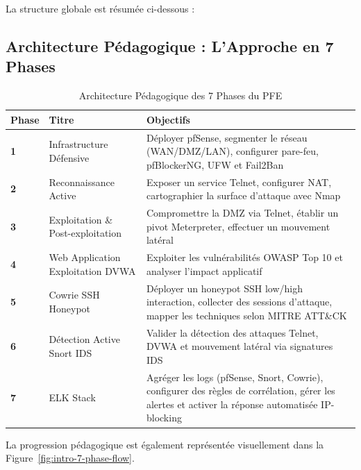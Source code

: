 \documentclass[12pt,a4paper,openany]{report}
\newcommand{\tableheadcolor}{\rowcolor{tableheadbg}}
\begin{document}
	La structure globale est résumée ci-dessous :
	
	\subsection{Architecture Pédagogique : L'Approche en 7 Phases}
	
	\begin{table}[H]
		\centering
		\renewcommand{\arraystretch}{1.5}
		\setlength{\arrayrulewidth}{0.5pt}
		\begin{tabular}{>{\centering\arraybackslash}p{1.5cm} p{4cm} p{7cm}}
			\arrayrulecolor{tableborder}
			\hline
			\tableheadcolor
			\textcolor{tableheadfg}{\textbf{Phase}} &
			\textcolor{tableheadfg}{\textbf{Titre}} &
			\textcolor{tableheadfg}{\textbf{Objectifs}} \\
			\hline
			\rowcolor{tablerowalt}
			\textbf{1} & Infrastructure Défensive & Déployer pfSense, segmenter le réseau (WAN/DMZ/LAN), configurer pare-feu, pfBlockerNG, UFW et Fail2Ban \\
			\textbf{2} & Reconnaissance Active & Exposer un service Telnet, configurer NAT, cartographier la surface d'attaque avec Nmap \\
			\rowcolor{tablerowalt}
			\textbf{3} & Exploitation \& Post-exploitation & Compromettre la DMZ via Telnet, établir un pivot Meterpreter, effectuer un mouvement latéral \\
			\textbf{4} & Web Application Exploitation DVWA & Exploiter les vulnérabilités OWASP Top 10 et analyser l'impact applicatif \\
			\rowcolor{tablerowalt}
			\textbf{5} & Cowrie SSH Honeypot & Déployer un honeypot SSH low/high interaction, collecter des sessions d'attaque, mapper les techniques selon MITRE ATT\&CK \\
			\textbf{6} & Détection Active Snort IDS & Valider la détection des attaques Telnet, DVWA et mouvement latéral via signatures IDS \\
			\rowcolor{tablerowalt}
			\textbf{7} & ELK Stack & Agréger les logs (pfSense, Snort, Cowrie), configurer des règles de corrélation, gérer les alertes et activer la réponse automatisée IP-blocking \\
			\hline
		\end{tabular}
		\caption{Architecture Pédagogique des 7 Phases du PFE}
		\label{tab:phases}
	\end{table}
	
	La progression pédagogique est également représentée visuellement dans la Figure~\ref{fig:intro-7-phase-flow}.
	
\end{document}
